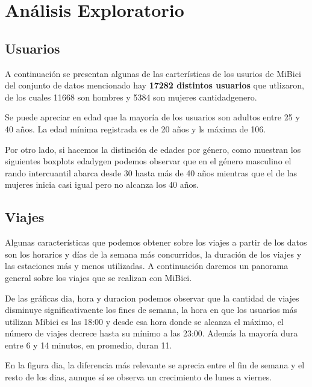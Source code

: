 \documentclass[letterpaper,spanish,reprint,nofootinbib,showkeys,aps]{revtex4-2}
\begin{document}
\section{Análisis Exploratorio }


\subsection*{Usuarios}
A continuación se presentan algunas de las carterísticas de los usurios de MiBici del conjunto de datos mencionado
hay \textbf{17282 distintos usuarios} que utlizaron, de los cuales 11668 son hombres y 5384 son mujeres {cantidadgenero}. 


Se puede apreciar en {edad} que la mayoría de los usuarios son adultos entre 25 y 40 años. La edad mínima
registrada es de 20 años y ls máxima de 106. 



Por otro lado, si hacemos la distinción de edades por género, como muestran los siguientes boxplots {edadygen}
podemos observar que en el género masculino el rando intercuantil abarca desde 30 hasta más de 40 años mientras que 
el de las mujeres inicia casi igual pero no alcanza los 40 años.




\subsection*{Viajes}
Algunas características que podemos obtener sobre los viajes a partir de los datos son los horarios y días de la semana 
más concurridos, la duración de los viajes y las estaciones más y menos utilizadas. A continuación daremos un panorama
general sobre los viajes que se realizan con MiBici.



De las gráficas {dia}, {hora} y {duracion} podemos observar que la cantidad de viajes disminuye significativaente
los fines de semana, la hora en que los usuarios más utilizan Mibici es las 18:00 y desde esa hora donde se alcanza el máximo,
el número de viajes decrece hasta su mínimo a las 23:00. Además la mayoría dura entre 6 y 14 minutos, en promedio, duran 11.





En la figura {dia}, la diferencia más relevante se aprecia entre el fin de semana y el resto de los dias, aunque sí se observa un crecimiento
de lunes a viernes.
\end{document}
